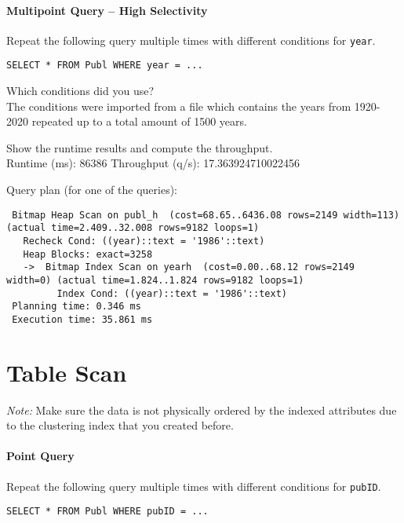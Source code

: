 \documentclass[11pt]{scrartcl}
\begin{document}
\paragraph{Multipoint Query -- High Selectivity}

Repeat the following query multiple times with different conditions for {\tt year}.

{\small
\begin{verbatim}
SELECT * FROM Publ WHERE year = ...
\end{verbatim}
}

\noindent
Which conditions did you use?\\
The conditions were imported from a file which contains the years from 1920-2020 repeated up to a total amount of 1500 years.

\smallskip\noindent
Show the runtime results and compute the throughput.\\
Runtime (ms): 86386
Throughput (q/s): 17.363924710022456

\smallskip\noindent
Query plan (for one of the queries):
{\small
\begin{verbatim}
 Bitmap Heap Scan on publ_h  (cost=68.65..6436.08 rows=2149 width=113) (actual time=2.409..32.008 rows=9182 loops=1)
   Recheck Cond: ((year)::text = '1986'::text)
   Heap Blocks: exact=3258
   ->  Bitmap Index Scan on yearh  (cost=0.00..68.12 rows=2149 width=0) (actual time=1.824..1.824 rows=9182 loops=1)
         Index Cond: ((year)::text = '1986'::text)
 Planning time: 0.346 ms
 Execution time: 35.861 ms
\end{verbatim}
}


\section{Table Scan}

\noindent \emph{Note:} Make sure the data is not physically ordered by
the indexed attributes due to the clustering index that you created
before.

\paragraph{Point Query}

Repeat the following query multiple times with different conditions for {\tt pubID}.

{\small
\begin{verbatim}
SELECT * FROM Publ WHERE pubID = ...
\end{verbatim}
}
\end{document}
